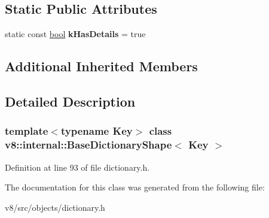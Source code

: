 \subsection*{Static Public Attributes}
\begin{DoxyCompactItemize}
\item 
\mbox{\label{classv8_1_1internal_1_1BaseDictionaryShape_abb9a43cf6fae11ee7a4c3d138205fee8}} 
static const \mbox{\hyperlink{classbool}{bool}} {\bfseries k\+Has\+Details} = true
\end{DoxyCompactItemize}
\subsection*{Additional Inherited Members}


\subsection{Detailed Description}
\subsubsection*{template$<$typename Key$>$\newline
class v8\+::internal\+::\+Base\+Dictionary\+Shape$<$ Key $>$}



Definition at line 93 of file dictionary.\+h.



The documentation for this class was generated from the following file\+:\begin{DoxyCompactItemize}
\item 
v8/src/objects/dictionary.\+h\end{DoxyCompactItemize}
